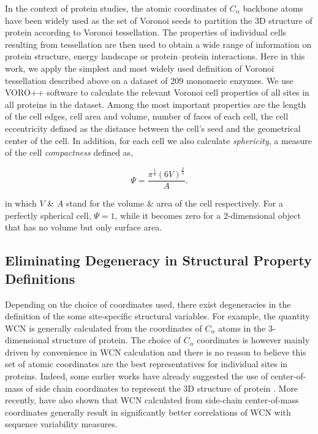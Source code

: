 \documentclass[11pt]{article}
\begin{document}
        In the context of protein studies, the atomic coordinates of $C_\alpha$ backbone atoms have been widely used as the set of Voronoi seeds to partition the 3D structure of protein according to Voronoi tessellation. The properties of individual cells resulting from tessellation are then used to obtain a wide range of information on protein structure, energy landscape or protein--protein interactions. Here in this work, we apply the simplest and most widely used definition of Voronoi tessellation described above on a dataset of $209$  monomeric enzymes. We use VORO++ software \citep[][]{Rycroft2009} to calculate the relevant Voronoi cell properties of all sites in all proteins in the dataset. Among the most important properties are the length of the cell edges, cell area and volume, number of faces of each cell, the cell eccentricity defined as the distance between the cell's seed and the geometrical center of the cell. In addition, for each cell we also calculate {\it sphericity}, a measure of the cell {\it compactness} defined as,

        \begin{equation}
        \label{eqn:sphericity}
        \Psi = \frac{\pi^{\frac{1}{3}}(6V)^{\frac{2}{3}}}{A}.
        \end{equation}

        in which $V$ \& $A$ stand for the volume \& area of the cell respectively. For a perfectly spherical cell, $\Psi=1$, while it becomes zero for a 2-dimensional object that has no volume but only surface area.

    \subsection*{Eliminating Degeneracy in Structural Property Definitions}

        Depending on the choice of coordinates used, there exist degeneracies in the definition of the some site-specific structural variables. For example, the quantity WCN is generally calculated from the coordinates of $C_\alpha$ atoms in the 3-dimensional structure of protein. The choice of $C_\alpha$ coordinates is however mainly driven by convenience in WCN calculation and there is no reason to believe this set of atomic coordinates are the best representatives for individual sites in proteins. Indeed, some earlier works have already suggested the use of center-of-mass of side chain coordinates to represent the 3D structure of protein \citep[e.g., ][]{soyer2000}. More recently, \citet{Marcos2015} have also shown that WCN calculated from side-chain center-of-mass coordinates generally result in significantly better correlations of WCN with sequence variability measures.\\
        
\end{document}
